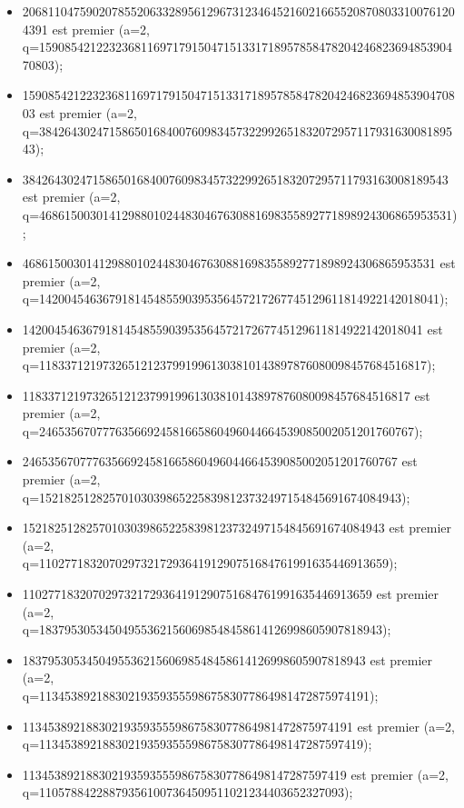 \documentclass{article}
\begin{document}
\begin{itemize}
\item 206811047590207855206332895612967312346452160216655208708033100761204391 est premier (a=2,\\ q=1590854212232368116971791504715133171895785847820424682369485390470803);
\item 1590854212232368116971791504715133171895785847820424682369485390470803 est premier (a=2,\\ q=3842643024715865016840076098345732299265183207295711793163008189543);
\item 3842643024715865016840076098345732299265183207295711793163008189543 est premier (a=2,\\ q=46861500301412988010244830467630881698355892771898924306865953531);
\item 46861500301412988010244830467630881698355892771898924306865953531 est premier (a=2,\\ q=142004546367918145485590395356457217267745129611814922142018041);
\item 142004546367918145485590395356457217267745129611814922142018041 est premier (a=2,\\ q=1183371219732651212379919961303810143897876080098457684516817);
\item 1183371219732651212379919961303810143897876080098457684516817 est premier (a=2,\\ q=24653567077763566924581665860496044664539085002051201760767);
\item 24653567077763566924581665860496044664539085002051201760767 est premier (a=2,\\ q=152182512825701030398652258398123732497154845691674084943);
\item 152182512825701030398652258398123732497154845691674084943 est premier (a=2,\\ q=1102771832070297321729364191290751684761991635446913659);
\item 1102771832070297321729364191290751684761991635446913659 est premier (a=2,\\ q=183795305345049553621560698548458614126998605907818943);
\item 183795305345049553621560698548458614126998605907818943 est premier (a=2,\\ q=1134538921883021935935559867583077864981472875974191);
\item 1134538921883021935935559867583077864981472875974191 est premier (a=2,\\ q=113453892188302193593555986758307786498147287597419);
\item 113453892188302193593555986758307786498147287597419 est premier (a=2,\\ q=110578842288793561007364509511021234403652327093);

\end{itemize}
\end{document}
